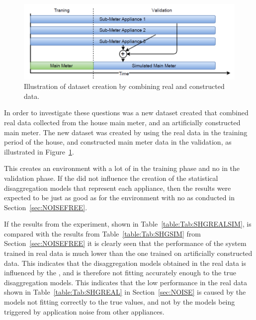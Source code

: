 \begin{figure}[H]
\centering
\includegraphics[width=1\textwidth]{billeder/REALSIM.png}
\caption{Illustration of dataset creation by combining real and constructed data.}
\label{fig:REALSIMILU}
\end{figure}

In order to investigate these questions was a new dataset created that combined real data collected from the house main meter, and an artificially constructed main meter. The new dataset was created by using the real data in the training period of the house, and constructed main meter data in the validation, as illustrated in Figure~\ref{fig:REALSIMILU}.

This creates an environment with a lot of  in the training phase and no  in the validation phase. If the  did not influence the creation of the statistical disaggregation models that represent each appliance, then the results were expected to be just as good as for the environment with no  as conducted in Section~\ref{sec:NOISEFREE}.




If the results from the experiment, shown in Table~\ref{table:Tab:SHGREALSIM}, is compared with the results from Table~\ref{table:Tab:SHGSIM} from Section~\ref{sec:NOISEFREE} it is clearly seen that the performance of the system trained in real data is much lower than the one trained on artificially constructed data. This indicates that the disaggregation models obtained in the real data is influenced by the , and is therefore not fitting accurately enough to the true disaggregation models. This indicates that the low performance in the real data shown in Table~\ref{table:Tab:SHGREAL} in Section~\ref{sec:NOISE} is caused by the models not fitting correctly to the true values, and not by the models being triggered by application noise from other appliances.

